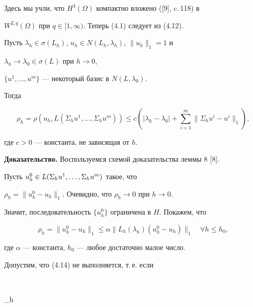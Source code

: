 Здесь мы учли, что $H^3(\Omega)$ компактно вложено ([9], c.\,118) в


$W^{2,q}(\Omega)$ при $q\in [1,\infty)$. Теперь (4.1) следует из (4.12).





\begin{thms} Пусть $\lambda_h \in \sigma(L_h)$, $u_h\in


N(L_h,\lambda_h)$, $\|u_h\|_1=1$ и


$\lambda_h \to \lambda_0\in \sigma(L)$ при $h \to 0$,


$\{u^1,\dotsc,u^m\}$ --- некоторый базис в $N(L,\lambda_0)$.


Тогда


\begin{equation}


\rho_h=\rho(u_h,L(\Sigma_h u^1,\dotsc,\Sigma_h u^m))\le


c(|\lambda_h-\lambda_0|+\sum_{i=1}^{m}\|\Sigma_h u^i-u^i\|_1),


\end{equation}


где $c>0$ --- константа, не зависящая от $h$.


\end{thms}





{\bf Доказательство.} Воспользуемся схемой доказательства леммы 8 [8].


Пусть $u_h^0\in\linebreak L(\Sigma_h u^1,\dotsc,\Sigma_h u^m)$ такое, что


$\rho_h=\|u^0_h-u_h\|_1$. Очевидно, что $\rho_h \to 0$ при $h\to 0$.


Значит, последовательность $\{u_h^0\}$ ограничена в $H$. Покажем, что


\begin{equation}


\rho_h=\|u^0_h-u_h\|_1\le \alpha \|L_h(\lambda_h)(u^0_h-u_h)\|_1 \quad


\forall h\le h_0,


\end{equation}


где $\alpha$ --- константа, $h_0$ --- любое достаточно малое число.


Допустим, что (4.14) не выполняется, т.\,е. если


$$


\rho_h \quad


